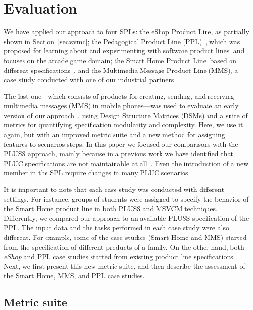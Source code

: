 \documentclass{sig-alternate}
\begin{document}
\section{Evaluation}
\label{sec:evaluation}

We have applied our approach to four SPLs: the eShop Product Line, as partially
shown  in Section~\ref{sec:svmc}; the Pedagogical Product Line
(PPL)~\cite{PPL:2008}, which was proposed for learning about and experimenting
with software product lines, and focuses on the arcade game domain; the Smart
Home Product Line, based on different
specifications~\cite{Pohl:2005aa,Alferez:2008aa}, and the Multimedia Message
Product Line (MMS), a case study conducted with one of our industrial partners.

The last one---which consists of products for creating, sending, and receiving
multimedia messages (MMS) in mobile phones---was used to evaluate an early
version of our approach~\cite{Bonifacio:2008aa}, using Design Structure Matrices
(DSMs) and a suite of metrics for quantifying
specification modularity and complexity. Here, we use it again, but with an
improved metric suite and a new method for assigning features to scenarios steps. In this paper we focused our comparisons with
the PLUSS approach, mainly because in a previous work we have identified that PLUC specifications are not maintainable at all~\cite{Bonifacio:2008aa}. Even the introduction of a new member in the SPL require changes in many PLUC scenarios.

It is important to note that each case study was conducted with different
settings. For instance, groups of students were assigned to specify the behavior
of the Smart Home product line in both PLUSS and MSVCM techniques. Differently, we
compared our approach to an available PLUSS specification of the PPL. The input
data and the tasks performed in each case study were also different. For example,
some of the case studies (Smart Home and MMS) started from the specification of
different products of a family. On the other hand, both \emph{eShop} and PPL case
studies started from existing product line specifications. Next, we first present this new metric suite,
and then describe the assessment of the Smart Home, MMS, and PPL case studies. 


\subsection{Metric suite}\label{sub:metric-suite}
\end{document}

